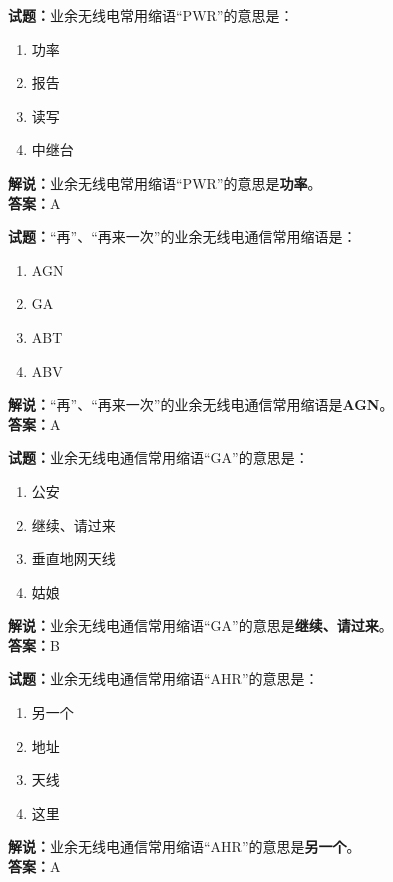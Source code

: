 \documentclass{ctexbook}
\begin{document}
\bigskip


\noindent\textbf{试题：}业余无线电常用缩语“PWR”的意思是：
\begin{enumerate}[leftmargin=3em]
\item 功率
\item 报告
\item 读写
\item 中继台
\end{enumerate}
\noindent\textbf{解说：}业余无线电常用缩语“PWR”的意思是\textbf{功率}。\\\noindent\textbf{答案：}A



\bigskip


\noindent\textbf{试题：}“再”、“再来一次”的业余无线电通信常用缩语是：
\begin{enumerate}[leftmargin=3em]
\item AGN
\item GA
\item ABT
\item ABV
\end{enumerate}
\noindent\textbf{解说：}“再”、“再来一次”的业余无线电通信常用缩语是\textbf{AGN}。\\\noindent\textbf{答案：}A



\bigskip


\noindent\textbf{试题：}业余无线电通信常用缩语“GA”的意思是：
\begin{enumerate}[leftmargin=3em]
\item 公安
\item 继续、请过来
\item 垂直地网天线
\item 姑娘
\end{enumerate}
\noindent\textbf{解说：}业余无线电通信常用缩语“GA”的意思是\textbf{继续、请过来}。\\\noindent\textbf{答案：}B



\bigskip


\noindent\textbf{试题：}业余无线电通信常用缩语“AHR”的意思是：
\begin{enumerate}[leftmargin=3em]
\item 另一个
\item 地址
\item 天线
\item 这里
\end{enumerate}
\noindent\textbf{解说：}业余无线电通信常用缩语“AHR”的意思是\textbf{另一个}。\\\noindent\textbf{答案：}A
\end{document}
